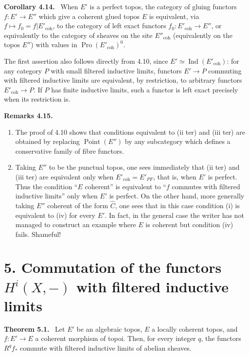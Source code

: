 \documentclass[11pt]{article}
\newcommand{\Pro}{\operatorname{Pro}}
\newcommand{\Ind}{\operatorname{Ind}}
\newcommand{\Ppoint}{\operatorname{Point}}
\newcommand{\coh}{\mathrm{coh}}
\newenvironment{statement}[1]{\par\medskip\noindent\textbf{#1.}\ }{\par\medskip}
\newenvironment{remarktext}[1]{\par\medskip\noindent\textbf{#1.}\ }{\par\medskip}
\begin{document}
\begin{statement}{Corollary 4.14}
When \(E'\) is a perfect topos, the category of gluing functors \(f:E'\to E''\) which give a coherent glued topos \(E\) is equivalent, via \(f\mapsto f_0=f|E'_{\coh}\), to the category of left exact functors \(f_0:E'_{\coh}\to E''\), or equivalently to the category of sheaves on the site \(E''_{\coh}\) (equivalently on the topos \(E''\)) with values in \(\Pro(E'_{\coh})^0\).
\end{statement}

The first assertion also follows directly from 4.10, since \(E'\simeq\Ind(E'_{\coh})\): for any category \(P\) with small filtered inductive limits, functors \(E'\to P\) commuting with filtered inductive limits are equivalent, by restriction, to arbitrary functors \(E'_{\coh}\to P\). If \(P\) has finite inductive limits, such a functor is left exact precisely when its restriction is.

\begin{remarktext}{Remarks 4.15}
\begin{enumerate}[label=\alph*)]
\item The proof of 4.10 shows that conditions equivalent to (ii ter) and (iii ter) are obtained by replacing \(\Ppoint(E'')\) by any subcategory which defines a conservative family of fibre functors.
\item Taking \(E''\) to be the punctual topos, one sees immediately that (ii ter) and (iii ter) are equivalent only when \(E'_{\coh}=E'_{PF}\), that is, when \(E'\) is perfect. Thus the condition ``\(E\) coherent'' is equivalent to ``\(f\) commutes with filtered inductive limits'' only when \(E'\) is perfect. On the other hand, more generally taking \(E''\) coherent of the form \(\widehat C\), one sees that in this case condition (i) is equivalent to (iv) for every \(E'\). In fact, in the general case the writer has not managed to construct an example where \(E\) is coherent but condition (iv) fails. Shameful!
\end{enumerate}
\end{remarktext}

\section*{5. Commutation of the functors \(H^i(X,-)\) with filtered inductive limits}

\begin{statement}{Theorem 5.1}
Let \(E'\) be an algebraic topos, \(E\) a locally coherent topos, and \(f:E'\to E\) a coherent morphism of topoi. Then, for every integer \(q\), the functors \(R^qf_*\) commute with filtered inductive limits of abelian sheaves.
\end{statement}
\end{document}
